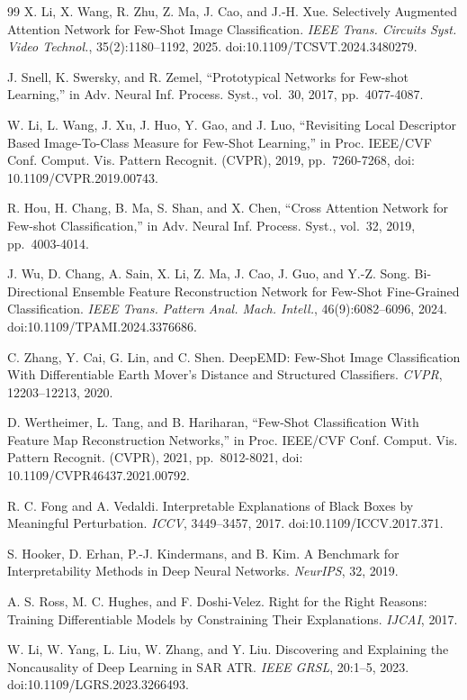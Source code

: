 \documentclass[journal,10pt,a4paper]{IEEEtran}
\begin{document}
\begin{thebibliography}{99}
X. Li, X. Wang, R. Zhu, Z. Ma, J. Cao, and J.-H. Xue. Selectively Augmented Attention Network for Few-Shot Image Classification. \emph{IEEE Trans. Circuits Syst. Video Technol.}, 35(2):1180--1192, 2025. doi:10.1109/TCSVT.2024.3480279.

J. Snell, K. Swersky, and R. Zemel, ``Prototypical Networks for Few-shot Learning,'' in Adv. Neural Inf. Process. Syst., vol.~30, 2017, pp.~4077-4087.

W. Li, L. Wang, J. Xu, J. Huo, Y. Gao, and J. Luo, ``Revisiting Local Descriptor Based Image-To-Class Measure for Few-Shot Learning,'' in Proc. IEEE/CVF Conf. Comput. Vis. Pattern Recognit. (CVPR), 2019, pp.~7260-7268, doi: 10.1109/CVPR.2019.00743.

R. Hou, H. Chang, B. Ma, S. Shan, and X. Chen, ``Cross Attention Network for Few-shot Classification,'' in Adv. Neural Inf. Process. Syst., vol.~32, 2019, pp.~4003-4014.

J. Wu, D. Chang, A. Sain, X. Li, Z. Ma, J. Cao, J. Guo, and Y.-Z. Song. Bi-Directional Ensemble Feature Reconstruction Network for Few-Shot Fine-Grained Classification. \emph{IEEE Trans. Pattern Anal. Mach. Intell.}, 46(9):6082--6096, 2024. doi:10.1109/TPAMI.2024.3376686.

C. Zhang, Y. Cai, G. Lin, and C. Shen. DeepEMD: Few-Shot Image Classification With Differentiable Earth Mover's Distance and Structured Classifiers. \emph{CVPR}, 12203--12213, 2020.

D. Wertheimer, L. Tang, and B. Hariharan, ``Few-Shot Classification With Feature Map Reconstruction Networks,'' in Proc. IEEE/CVF Conf. Comput. Vis. Pattern Recognit. (CVPR), 2021, pp.~8012-8021, doi: 10.1109/CVPR46437.2021.00792.

R. C. Fong and A. Vedaldi. Interpretable Explanations of Black Boxes by Meaningful Perturbation. \emph{ICCV}, 3449--3457, 2017. doi:10.1109/ICCV.2017.371.

S. Hooker, D. Erhan, P.-J. Kindermans, and B. Kim. A Benchmark for Interpretability Methods in Deep Neural Networks. \emph{NeurIPS}, 32, 2019.

A. S. Ross, M. C. Hughes, and F. Doshi-Velez. Right for the Right Reasons: Training Differentiable Models by Constraining Their Explanations. \emph{IJCAI}, 2017.

W. Li, W. Yang, L. Liu, W. Zhang, and Y. Liu. Discovering and Explaining the Noncausality of Deep Learning in SAR ATR. \emph{IEEE GRSL}, 20:1--5, 2023. doi:10.1109/LGRS.2023.3266493.


\end{thebibliography}
\end{document}
